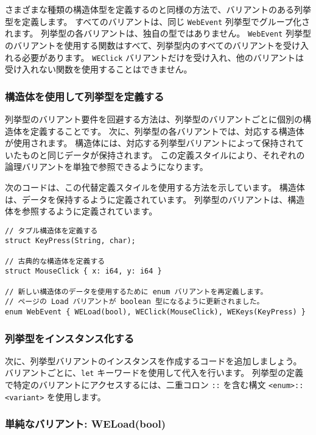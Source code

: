 さまざまな種類の構造体型を定義するのと同様の方法で、バリアントのある列挙型を定義します。 すべてのバリアントは、同じ \texttt{WebEvent} 列挙型でグループ化されます。 列挙型の各バリアントは、独自の型ではありません。 \texttt{WebEvent} 列挙型のバリアントを使用する関数はすべて、列挙型内のすべてのバリアントを受け入れる必要があります。 \texttt{WEClick} バリアントだけを受け入れ、他のバリアントは受け入れない関数を使用することはできません。

\subsubsection{構造体を使用して列挙型を定義する}

列挙型のバリアント要件を回避する方法は、列挙型のバリアントごとに個別の構造体を定義することです。 次に、列挙型の各バリアントでは、対応する構造体が使用されます。 構造体には、対応する列挙型バリアントによって保持されていたものと同じデータが保持されます。 この定義スタイルにより、それぞれの論理バリアントを単独で参照できるようになります。

次のコードは、この代替定義スタイルを使用する方法を示しています。 構造体は、データを保持するように定義されています。 列挙型のバリアントは、構造体を参照するように定義されています。

\begin{lstlisting}[numbers=none]
// タプル構造体を定義する
struct KeyPress(String, char);

// 古典的な構造体を定義する
struct MouseClick { x: i64, y: i64 }

// 新しい構造体のデータを使用するために enum バリアントを再定義します。
// ページの Load バリアントが boolean 型になるように更新されました。
enum WebEvent { WELoad(bool), WEClick(MouseClick), WEKeys(KeyPress) }
\end{lstlisting}

\subsubsection{列挙型をインスタンス化する}

次に、列挙型バリアントのインスタンスを作成するコードを追加しましょう。 バリアントごとに、\texttt{let} キーワードを使用して代入を行います。 列挙型の定義で特定のバリアントにアクセスするには、二重コロン \texttt{::} を含む構文 \texttt{<enum>::<variant>} を使用します。

\subsubsection{単純なバリアント: WELoad(bool)}

